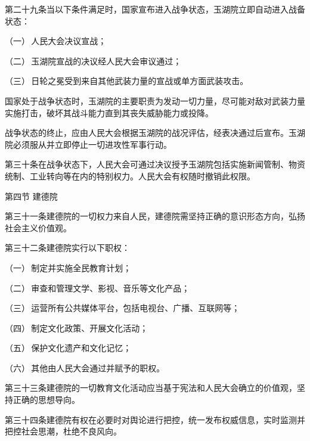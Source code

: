 {\noindent 第二十九条\quad 当以下条件满足时，国家宣布进入战争状态，玉湖院立即自动进入战备状态：

\hspace*{2em}（一）\,人民大会决议宣战；

\hspace*{2em}（二）\,玉湖院宣战的决议经人民大会审议通过；

\hspace*{2em}（三）\,日轮之冕受到来自其他武装力量的宣战或单方面武装攻击。

国家处于战争状态时，玉湖院的主要职责为发动一切力量，尽可能对敌对武装力量实施打击，破坏其战斗能力直到其丧失威胁能力或投降。

战争状态的终止，应由人民大会根据玉湖院的战况评估，经表决通过后宣布。玉湖院必须服从并立即停止一切进攻性军事行动。

\noindent 第三十条\quad 在战争状态下，人民大会可通过决议授予玉湖院包括实施新闻管制、物资统制、工业转向等在内的特别权力。人民大会有权随时撤销此权限。

\vspace{0.6\baselineskip}

第四节\,\,建德院

\vspace{0.6\baselineskip}

\noindent 第三十一条\quad 建德院的一切权力来自人民，建德院需坚持正确的意识形态方向，弘扬社会主义价值观。

\noindent 第三十二条\quad 建德院实行以下职权：

\hspace*{2em}（一）\,制定并实施全民教育计划；

\hspace*{2em}（二）\,审查和管理文学、影视、音乐等文化产品；

\hspace*{2em}（三）\,运营所有公共媒体平台，包括电视台、广播、互联网等；

\hspace*{2em}（四）\,制定文化政策、开展文化活动；

\hspace*{2em}（五）\,保护文化遗产和文化记忆；

\hspace*{2em}（六）\,其他由人民大会通过并赋予的职权。

\noindent 第三十三条\quad 建德院的一切教育文化活动应当基于宪法和人民大会确立的价值观，坚持正确的思想导向。

\noindent 第三十四条\quad 建德院有权在必要时对舆论进行把控，统一发布权威信息，实时监测并把控社会思潮，杜绝不良风向。

}
